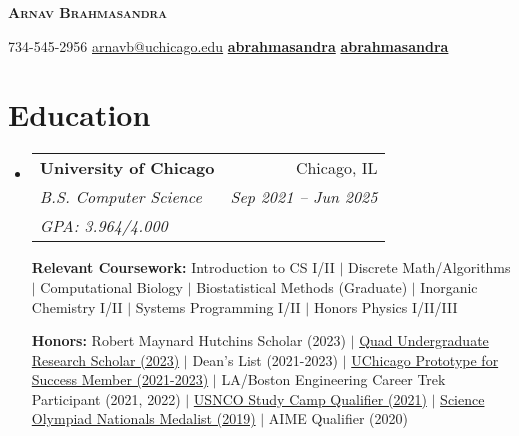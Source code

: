 \documentclass[letterpaper,11pt]{article}
\makeatletter
\newcommand{\phonesymbol}{\faPhone}
\newcommand{\linkedinsymbol}{\faLinkedin}
\newcommand{\githubsymbol}{\faGithub}
\newcommand{\mailsymbol}{\faEnvelope}
\newcommand{\printinfo}[2]{\mbox{{#1}\hspace{0.5em}#2\hspace{0.5em}}}
\newcommand{\mailaddress}[1]{\printinfo{\mailsymbol}{#1}}
\newcommand{\phone}[1]{\printinfo{\phonesymbol}{#1}}
\newcommand{\linkedin}[1]{\printinfo{\linkedinsymbol}{#1}}
\newcommand{\github}[1]{\printinfo{\githubsymbol}{#1}}
\newcommand{\courseItem}[1]{
    {\small #1 \vspace{-2pt}}
}
\newcommand{\honorsItem}[1]{
    {\small #1 \vspace{-2pt}}
}
\newcommand{\resumeEduSubheading}[5]{
  \vspace{-2pt}\item
    \begin{tabular*}{0.97\textwidth}[t]{l@{\extracolsep{\fill}}r}
      \textbf{#1} & #2 \\
      \textit{\small#3} & \textit{\small #4} \\
      \textit{\small#5}
    \end{tabular*}\vspace{-7pt}
}
\newcommand{\resumeSubHeadingListStart}{\begin{itemize}[leftmargin=0.15in, label={}]}
\newcommand{\resumeSubHeadingListEnd}{\end{itemize}}
\makeatother
\begin{document}

\begin{center}
    \textbf{\Huge \scshape Arnav Brahmasandra} \\ \vspace{1pt}
    
    \phone{734-545-2956} 
    \mailaddress{\href{mailto:arnavb@uchicago.edu}{arnavb@uchicago.edu}}
    \linkedin{\href{https://www.linkedin.com/in/abrahmasandra/}{\textbf{abrahmasandra}}}
    \github{\href{https://github.com/abrahmasandra}{\textbf{abrahmasandra}}}
\end{center}


\section{Education}
  \resumeSubHeadingListStart
    \resumeEduSubheading
      {University of Chicago}{Chicago, IL}
      {B.S. Computer Science}{Sep 2021 -- Jun 2025}{GPA: 3.964/4.000} \newline

    \textbf{Relevant Coursework:} \courseItem{Introduction to CS I/II $|$ Discrete Math/Algorithms $|$ Computational Biology $|$ Biostatistical Methods (Graduate) $|$ Inorganic Chemistry I/II $|$ Systems Programming I/II $|$ Honors Physics I/II/III}
    
    \textbf{Honors:} \honorsItem{Robert Maynard Hutchins Scholar (2023) $|$ \href{https://ugradresearchsymposium.omeka.net/items/show/120}{Quad Undergraduate Research Scholar (2023)} $|$ Dean's List (2021-2023) $|$ \href{https://careeradvancement.uchicago.edu/careers-in/engineering/prototype-for-success/class-of-2025}{UChicago Prototype for Success Member (2021-2023)} $|$ LA/Boston Engineering Career Trek Participant (2021, 2022) $|$  \href{https://www.acs.org/content/acs/en/pressroom/newsreleases/2021/may/2021-chemistry-olympiad-virtual-study-camp-students-named.html}{USNCO Study Camp Qualifier (2021)} $|$ \href{https://www.soinc.org/sites/default/files/uploaded_files/2019_Final_C_results_by_rank.pdf}{Science Olympiad Nationals Medalist (2019)} $|$ AIME Qualifier (2020)}
  \resumeSubHeadingListEnd
\end{document}
